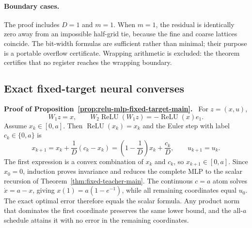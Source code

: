\documentclass[twoside,11pt]{article}
\renewenvironment{proof}[1][Proof]{\par\noindent\textbf{#1.}\ }{\hfill\BlackBox\par\medskip}
\begin{document}
\paragraph{Boundary cases.}
The proof includes $D=1$ and $m=1$.  When $m=1$, the residual is identically
zero away from an impossible half-grid tie, because the fine and coarse
lattices coincide.  The bit-width formulas are sufficient rather than
minimal; their purpose is a portable overflow certificate.  Wrapping
arithmetic is excluded: the theorem certifies that no register reaches the
wrapping boundary.

\subsection{Exact fixed-target neural converses}
\label{app:neural-converse-proofs}

\begin{proof}[Proof of Proposition~\ref{prop:relu-mlp-fixed-target-main}]
For $z=(x,u)$,
\begin{equation}
 W_1z=x,
 \qquad
 W_2\operatorname{ReLU}(W_1z)
 =-\operatorname{ReLU}(x)e_1.
 \label{eq:app-mlp-eval}
\end{equation}
Assume $x_k\in[0,a]$.  Then $\operatorname{ReLU}(x_k)=x_k$ and the Euler step
with label $c_k\in\{0,a\}$ is
\begin{equation}
 x_{k+1}=x_k+\frac1D(c_k-x_k)
 =\left(1-\frac1D\right)x_k+\frac{c_k}{D},
 \qquad u_{k+1}=u_k.
 \label{eq:app-mlp-rec}
\end{equation}
The first expression is a convex combination of $x_k$ and $c_k$, so
$x_{k+1}\in[0,a]$.  Since $x_0=0$, induction proves invariance and reduces the
complete MLP to the scalar recursion of Theorem~\ref{thm:fixed-teacher-main}.
The continuous $c=a$ atom solves $\dot x=a-x$, giving
$x(1)=a(1-e^{-1})$, while all remaining coordinates equal $u_0$.  The exact
optimal error therefore equals the scalar formula.  Any product norm that
dominates the first coordinate preserves the same lower bound, and the
all-$a$ schedule attains it with no error in the remaining coordinates.
\end{proof}
\end{document}
